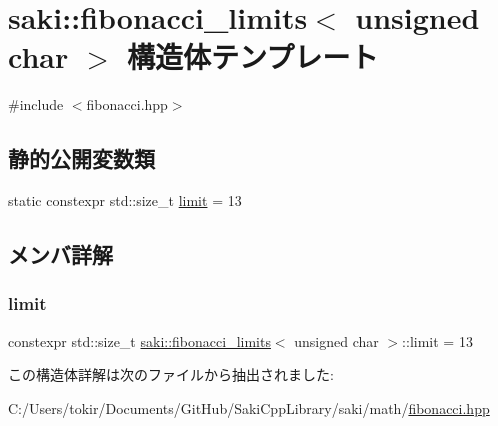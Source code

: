 \hypertarget{structsaki_1_1fibonacci__limits_3_01unsigned_01char_01_4}{}\section{saki\+:\+:fibonacci\+\_\+limits$<$ unsigned char $>$ 構造体テンプレート}
\label{structsaki_1_1fibonacci__limits_3_01unsigned_01char_01_4}


{\ttfamily \#include $<$fibonacci.\+hpp$>$}

\subsection*{静的公開変数類}
\begin{DoxyCompactItemize}
\item 
static constexpr std\+::size\+\_\+t \mbox{\hyperlink{structsaki_1_1fibonacci__limits_3_01unsigned_01char_01_4_a00ae7036814f186358f071f632153848}{limit}} = 13
\end{DoxyCompactItemize}


\subsection{メンバ詳解}
\mbox{\label{structsaki_1_1fibonacci__limits_3_01unsigned_01char_01_4_a00ae7036814f186358f071f632153848}} 
\subsubsection{\texorpdfstring{limit}{limit}}
{\footnotesize\ttfamily constexpr std\+::size\+\_\+t \mbox{\hyperlink{structsaki_1_1fibonacci__limits}{saki\+::fibonacci\+\_\+limits}}$<$ unsigned char $>$\+::limit = 13\hspace{0.3cm}{\ttfamily [static]}}



この構造体詳解は次のファイルから抽出されました\+:\begin{DoxyCompactItemize}
\item 
C\+:/\+Users/tokir/\+Documents/\+Git\+Hub/\+Saki\+Cpp\+Library/saki/math/\mbox{\hyperlink{fibonacci_8hpp}{fibonacci.\+hpp}}\end{DoxyCompactItemize}
